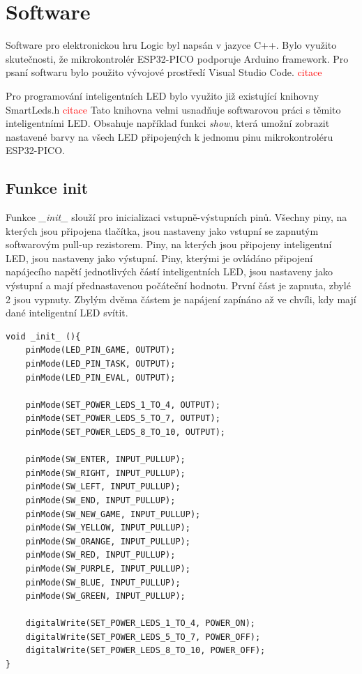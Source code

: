 \chapter{Software}
Software pro elektronickou hru Logic byl napsán v jazyce C++. Bylo využito skutečnosti, že mikrokontrolér ESP32-PICO podporuje Arduino 
framework. Pro psaní softwaru bylo použito vývojové prostředí Visual Studio Code. \textcolor{red}{citace}%

Pro programování inteligentních LED bylo využito již existující knihovny SmartLeds.h \textcolor{red}{citace}%
Tato knihovna velmi usnadňuje softwarovou práci s těmito inteligentními LED. Obsahuje například funkci {\it show}, která umožní zobrazit 
nastavené barvy na všech LED připojených k jednomu pinu mikrokontroléru ESP32-PICO. 

\section{Funkce init}
Funkce {\it \_init\_} slouží pro inicializaci vstupně-výstupních pinů. Všechny piny, na kterých jsou připojena tlačítka, jsou nastaveny jako 
vstupní se zapnutým softwarovým pull-up rezistorem. Piny, na kterých jsou připojeny inteligentní LED, jsou nastaveny jako výstupní. Piny,
kterými je ovládáno připojení napájecího napětí jednotlivých částí inteligentních LED, jsou nastaveny jako výstupní a mají přednastavenou 
počáteční hodnotu. První část je zapnuta, zbylé 2 jsou vypnuty. Zbylým dvěma částem je napájení zapínáno až ve chvíli, kdy mají dané 
inteligentní LED svítit.

\begin{minipage}{\linewidth}
\begin{lstlisting}[frame=single,numbers=right,caption={Funkce pro úvodní inicializaci hardwaru.},label=lst:priklad.vypis.kodu.C,basicstyle=\ttfamily\small, keywordstyle=\color{black}\bfseries\underbar,]
void _init_ (){
    pinMode(LED_PIN_GAME, OUTPUT);
    pinMode(LED_PIN_TASK, OUTPUT);
    pinMode(LED_PIN_EVAL, OUTPUT);

    pinMode(SET_POWER_LEDS_1_TO_4, OUTPUT);
    pinMode(SET_POWER_LEDS_5_TO_7, OUTPUT);
    pinMode(SET_POWER_LEDS_8_TO_10, OUTPUT);

    pinMode(SW_ENTER, INPUT_PULLUP);
    pinMode(SW_RIGHT, INPUT_PULLUP);
    pinMode(SW_LEFT, INPUT_PULLUP);
    pinMode(SW_END, INPUT_PULLUP);
    pinMode(SW_NEW_GAME, INPUT_PULLUP);
    pinMode(SW_YELLOW, INPUT_PULLUP);
    pinMode(SW_ORANGE, INPUT_PULLUP);
    pinMode(SW_RED, INPUT_PULLUP);
    pinMode(SW_PURPLE, INPUT_PULLUP);
    pinMode(SW_BLUE, INPUT_PULLUP);
    pinMode(SW_GREEN, INPUT_PULLUP);

    digitalWrite(SET_POWER_LEDS_1_TO_4, POWER_ON); 
    digitalWrite(SET_POWER_LEDS_5_TO_7, POWER_OFF);
    digitalWrite(SET_POWER_LEDS_8_TO_10, POWER_OFF);
}
    \end{lstlisting}
    \end{minipage}

